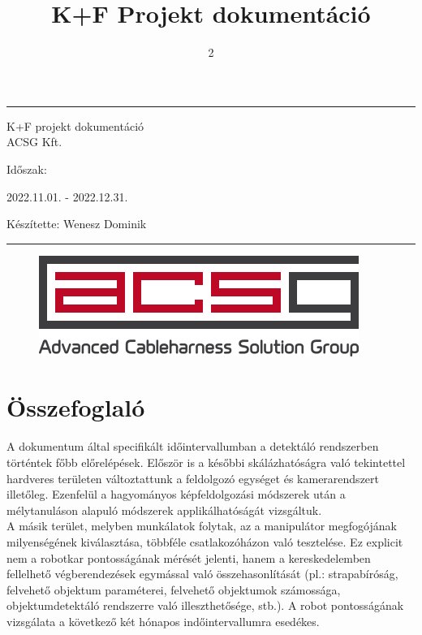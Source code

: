\documentclass{article}
\title{K+F Projekt dokumentáció}
\author{}
\date{2}
\begin{document}

\begin{center}
    \hrule
    \vspace{0.5cm}
    \begin{Huge}
    K+F projekt dokumentáció\\
    ACSG Kft.\\
    \end{Huge}
    \vspace{0.5cm}
    \begin{huge}
    Időszak:\\
    \end{huge}
    \begin{Large}
    2022.11.01. - 2022.12.31.\\
    \end{Large} \vspace{10pt}
    \begin{large}
    Készítette: Wenesz Dominik\\
    \end{large}\vspace{0.5cm}
    \hrule
    
  \end{center}
  \begin{figure}[b]
    \centering
    \includegraphics[]{acsg.png}
\end{figure}

  


\thispagestyle{empty}
\setcounter{page}{0}




\newpage
\tableofcontents
\newpage

\section{Összefoglaló}
A dokumentum által specifikált időintervallumban a detektáló rendszerben történtek
főbb előrelépések. Először is a későbbi skálázhatóságra való tekintettel hardveres
területen változtattunk a feldolgozó egységet és kamerarendszert illetőleg. 
Ezenfelül a hagyományos képfeldolgozási módszerek után a mélytanuláson alapuló
módszerek applikálhatóságát vizsgáltuk.\\
A másik terület, melyben munkálatok folytak, az a manipulátor megfogójának
milyenségének kiválasztása, többféle csatlakozóházon való tesztelése. Ez explicit
nem a robotkar pontosságának mérését jelenti, hanem a kereskedelemben fellelhető
végberendezések egymással való összehasonlítását (pl.: strapabíróság, felvehető objektum paraméterei, felvehető objektumok számossága, objektumdetektáló rendszerre 
való illeszthetősége, stb.). A robot pontosságának vizsgálata a következő két hónapos
indőintervallumra esedékes.
\end{document}
